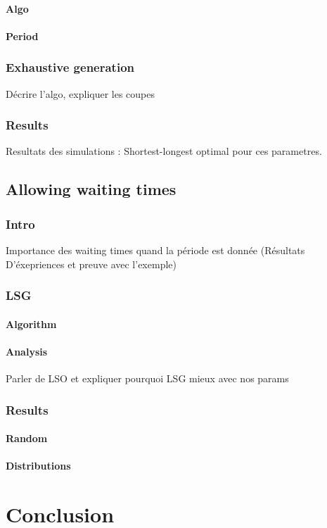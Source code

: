 \documentclass[a4paper,10pt]{article}
\begin{document}
      \paragraph{Algo}
      \paragraph{Period}
    \subsubsection{Exhaustive generation}
      Décrire l'algo, expliquer les coupes
    \subsubsection{Results}
      Resultats des simulations : Shortest-longest optimal pour ces parametres.
      
   \subsection{Allowing waiting times}
     \subsubsection{Intro}
	Importance des waiting times quand la période est donnée (Résultats D'éxepriences et preuve avec l'exemple)
     \subsubsection{LSG}
	\paragraph{Algorithm}
	\paragraph{Analysis}
	  Parler de LSO et expliquer pourquoi LSG mieux avec nos params
     \subsubsection{Results}
	 \paragraph{Random}
	 \paragraph{Distributions}
   
\section{Conclusion}
\end{document}
